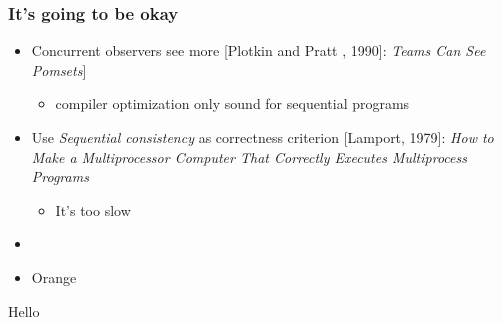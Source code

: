 \documentclass[t,aspectratio=169]{beamer} %
\begin{document}
{
\begin{frame}
\end{frame}
}

{
\begin{frame}
\end{frame}
}


\begin{frame}
  \frametitle{It's going to be okay}
  \begin{itemize}[<+->]
  \item Concurrent observers see more [Plotkin and Pratt , 1990]: \emph{Teams
      Can See Pomsets}]
    \begin{itemize}
    \item compiler optimization only sound for sequential programs      
    \end{itemize}
  \item Use \emph{Sequential consistency} as correctness criterion [Lamport,
    1979]: \emph{How to Make a Multiprocessor Computer That Correctly
      Executes Multiprocess Programs}
    \begin{itemize}
    \item It's too slow
    \end{itemize}
  \item 
  \item Orange
  \end{itemize}
\end{frame}

\begin{frame}
  \fontsize{80}{80}\selectfont
  Hello
\end{frame}
\end{document}
